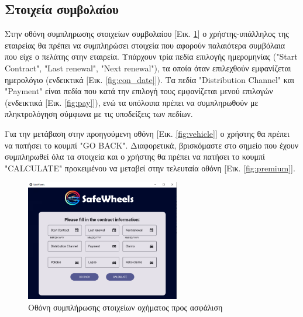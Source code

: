 \documentclass{llncs}
\begin{document}
\newpage
\subsection{Στοιχεία συμβολαίου}
Στην οθόνη συμπληρωσης στοιχείων συμβολαίου [Εικ. \ref{fig:contract}] ο χρήστης-υπάλληλος της εταιρείας θα πρέπει να συμπληρώσει στοιχεία που αφορούν παλαιότερα συμβόλαια που είχε ο πελάτης στην εταιρεία.
Υπάρχουν τρία πεδία επιλογής ημερομηνίας ("Start Contract", "Last renewal", "Next renewal"), τα οποία όταν επιλεχθούν εμφανίζεται ημερολόγιο (ενδεικτικά [Εικ. \ref{fig:con_date}]). Τα πεδία "Distribution Channel" και "Payment" είναι πεδία που
κατά την επιλογή τους εμφανίζεται μενού επιλογών (ενδεικτικά [Εικ. \ref{fig:pay}]), ενώ τα υπόλοιπα πρέπει να συμπληρωθούν με πληκτρολόγηση σύμφωνα με τις υποδείξεις των πεδίων.

Για την μετάβαση στην προηγούμενη οθόνη [Εικ. \ref{fig:vehicle}] ο χρήστης θα πρέπει να πατήσει το κουμπί "GO BACK". Διαφορετικά, βρισκόμαστε στο σημείο που έχουν συμπληρωθεί όλα τα στοιχεία και ο χρήστης θα πρέπει να πατήσει το 
κουμπί "CALCULATE" προκειμένου να μεταβεί στην τελευταία οθόνη [Εικ. \ref{fig:premium}].

\begin{figure}
    \begin{center}
        \includegraphics[width=0.6\textwidth]{images/contract.png}
    \end{center}
    \caption{Οθόνη συμπλήρωσης στοιχείων οχήματος προς ασφάλιση}  
    \label{fig:contract}  
\end{figure}
\end{document}
